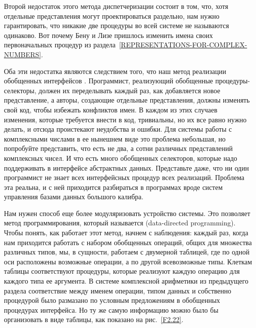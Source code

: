 Второй недостаток этого метода диспетчеризации состоит в
том, что, хотя отдельные представления могут проектироваться раздельно,
нам нужно гарантировать, что никакие две процедуры во всей системе не
называются одинаково.  Вот почему Бену и Лизе пришлось изменить
имена своих первоначальных процедур из 
раздела~\ref{REPRESENTATIONS-FOR-COMPLEX-NUMBERS}.

Оба эти недостатка являются следствием того, что наш
метод реализации обобщенных интерфейсов 
.  Программист,
реализующий обобщенные процедуры-селекторы, должен их переделывать
каждый раз, как добавляется новое представление, а авторы, создающие
отдельные представления, должны изменять свой код, чтобы
избежать конфликтов имен.  В каждом из этих случаев изменения, которые
требуется внести в код, тривиальны, но их все равно нужно делать, и
отсюда проистекают неудобства и ошибки.  Для системы работы с
комплексными числами в ее нынешнем виде это проблема небольшая,
но попробуйте представить, что есть не два, а сотни различных
представлений комплексных чисел.  И что есть много
обобщенных селекторов, которые надо поддерживать в интерфейсе
абстрактных данных.  Представьте даже, что ни один программист не
знает всех интерфейсных процедур всех реализаций.  Проблема эта
реальна, и с ней приходится разбираться в программах вроде
систем управления базами данных большого калибра.

Нам нужен способ еще более модуляризовать устройство
системы.  Это позволяет  метод программирования, который
называется 
 (data-directed programming).
Чтобы понять, как работает этот метод, начнем с наблюдения: каждый
раз, когда нам приходится работать с набором обобщенных операций,
общих для множества различных типов, мы, в сущности, работаем с двумерной
таблицей, где по одной оси расположены возможные операции, а по другой
всевозможные типы.  Клеткам таблицы соответствуют процедуры, которые
реализуют каждую операцию для каждого типа ее аргумента.  В системе
комплексной арифметики из предыдущего раздела соответствие
между именем операции, типом данных и собственно процедурой было
размазано по условным предложениям в обобщенных процедурах
интерфейса.  Но ту же самую информацию можно было бы организовать в
виде таблицы, как показано на рис.~\ref{F2.22}.

